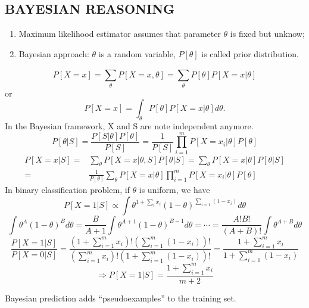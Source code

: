 \subsection{BAYESIAN REASONING}%

\begin{enumerate}
    \item Maximum likelihood estimator assumes that parameter $ \theta $ is fixed but unknow;
    \item Bayesian approach: $ \theta $ is a random variable, $ P[\theta] $ is called prior distribution.
\end{enumerate}

\[
    P\left[ X = x \right] = \sum^{}_{\theta} P \left[ X = x, \theta \right] = \sum^{}_{\theta} P[\theta] P[X = x | \theta]
\]
or
\[
    P[ X = x ] = \int_{\theta} P[\theta] P [X = x | \theta] d \theta.
\]
In the Bayesian framework, X and S are note independent anymore.
\[
    P[\theta | S] = \frac{P[S | \theta] P[\theta]}{P[S]}  = \frac{1}{P [S]} \prod^m_{i=1} P[X = x_i | \theta] P[\theta]
\]
\begin{align*}
    P\left[ X = x | S \right] =& \sum^{}_{\theta} P[ X = x | \theta, S ] P [\theta | S] 
    = \sum^{}_{\theta} P [X = x | \theta] P[ \theta|S ] \\
    =& \frac{1}{P[\theta]} \sum^{}_{\theta} P[X = x | \theta] \prod^m_{i=1} P[X = x_i | \theta] P[\theta]
\end{align*}
In binary classification problem, if $ \theta $ is uniform, we have
\[
    P\left[ X = 1 | S \right] \propto \int \theta^{1 + \sum^{}_{i} x_i} {(1 - \theta)}^{\sum^{}_{i=1} (1 - x_i)} d\theta
\]
\[
    \int \theta^A {(1 - \theta)}^B d\theta = \frac{B}{A + 1} \int \theta^{A+1} {(1 - \theta)}^{B-1} d \theta
    = \cdots = \frac{A! B!}{(A + B)!} \int \theta^{A+B} d\theta
\]
\[
    \frac{ P\left[ X = 1 | S \right]}{ P \left[ X = 0 | S \right]}  = \frac{(1 + \sum^{m}_{i=1} x_i)! ( \sum^{m}_{i=1} (1 - x_i))!}{( \sum^{m}_{i=1} x_i)! (1 + \sum^{m}_{i=1} (1 - x_i))!} = \frac{1 + \sum^{m}_{i=1} x_i}{1 + \sum^{m}_{i=1} (1 - x_i)} 
\]
\[
    \Rightarrow P\left[ X = 1 | S \right] = \frac{1 + \sum^{m}_{i=1} x_i}{m + 2}   
\]

Bayesian prediction adds ``pseudoexamples'' to the training set.




